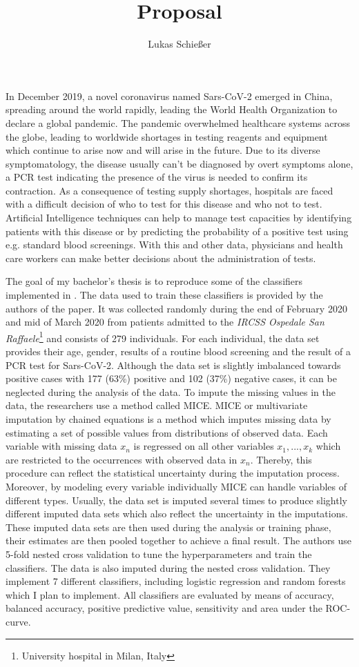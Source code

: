 \documentclass[12pt,a4paper,oneside]{article}
\title{Proposal}
\author{Lukas Schießer}
\date{}
\begin{document}
\maketitle
In December 2019, a novel coronavirus named Sars-CoV-2 emerged in China, spreading around the world rapidly, leading the World Health Organization to declare a global pandemic. The pandemic overwhelmed healthcare systems across the globe, leading to worldwide shortages in testing reagents and equipment which continue to arise now and will arise in the future. \cite{jaecklin_2020, asm.org_2020}
Due to its diverse symptomatology, the disease usually can't be diagnosed by overt symptoms alone, a PCR test indicating the presence of the virus is needed to confirm its contraction.
As a consequence of testing supply shortages, hospitals are faced with a difficult decision of who to test for this disease and who not to test.
Artificial Intelligence techniques can help to manage test capacities by identifying patients with this disease or by predicting the probability of a positive test using e.g. standard blood screenings. With this and other data, physicians and health care workers can make better decisions about the administration of tests.
\par
The goal of my bachelor's thesis is to reproduce some of the classifiers implemented in \cite{RN127}. The data used to train these classifiers is provided by the authors of the paper. It was collected randomly during the end of February 2020 and mid of March 2020 from patients admitted to the \textit{IRCSS Ospedale San Raffaele}\footnote{University hospital in Milan, Italy} and consists of 279 individuals. For each individual, the data set provides their age, gender, results of a routine blood screening and the result of a PCR test for Sars-CoV-2. Although the data set is slightly imbalanced towards positive cases with 177 (63\%) positive and 102 (37\%) negative cases, it can be neglected during the analysis of the data. To impute the missing values in the data, the researchers use a method called MICE. MICE or multivariate imputation by chained equations is a method which imputes missing data by estimating a set of possible values from distributions of observed data. Each variable with missing data $x_n$ is regressed on all other variables $x_1, ..., x_k$ which are restricted to the occurrences with observed data in $x_n$. Thereby, this procedure can reflect the statistical uncertainty during the imputation process. Moreover, by modeling every variable individually MICE can handle variables of different types. Usually, the data set is imputed several times to produce slightly different imputed data sets which also reflect the uncertainty in the imputations. These imputed data sets are then used during the analysis or training phase, their estimates are then pooled together to achieve a final result. \cite{RN141,RN142, RN144} The authors use 5-fold nested cross validation to tune the hyperparameters and train the classifiers. The data is also imputed during the nested cross validation. They implement 7 different classifiers, including logistic regression and random forests which I plan to implement. All classifiers are evaluated by means of accuracy, balanced accuracy, positive predictive value, sensitivity and area under the ROC-curve.
\end{document}
